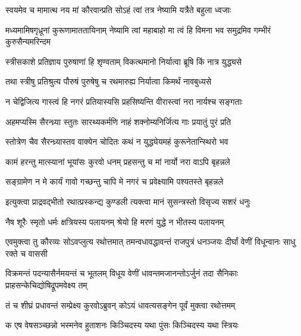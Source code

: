 \twolineshloka
{स्वयमेव च मामात्थ नय मां कौरवान्प्रति}
{सोऽहं त्वां तत्र नेष्यामि यत्रैते बहुला ध्वजाः}


\threelineshloka
{मध्यमामिषगृध्रूनां कुरूणामाततायिनाम्}
{नेष्यामि त्वां महाबाहो मा त्वं हि विमना भव}
{समुद्रमिव गम्भीरं कुरुसैन्यमरिन्दम}


\twolineshloka
{स्त्रीसकाशे प्रतिज्ञाय पुरुषाणां हि शृण्वताम्}
{विकत्थमानो निर्यात्वा ब्रूषि किं नात्र युद्ध्यसे}


\twolineshloka
{तथा स्त्रीषु प्रतिश्रुत्य पौरुषं पुरुषेषु च}
{रथमारुह्य निर्यात्वा किमर्थं नावबुध्यसे}


\twolineshloka
{न चेद्विजित्य गास्त्वं हि नगरं प्रतियास्यसि}
{प्रहसिष्यन्ति वीरास्त्वां नरा नार्यश्च सङ्गताः}


\twolineshloka
{अहमप्यस्मि सैरन्ध्र्या स्तुतः सारथ्यकर्मणि}
{नाहं शक्नोम्यनिर्जित्य गाः प्रयातुं पुरं प्रति}


\twolineshloka
{स्तोत्रेण चैव सैरन्ध्र्यास्तव वाक्येन चोदितः}
{कथं न युद्ध्येयमहं कुरूनेतान्स्थिरो भव}




\twolineshloka
{कामं हरन्तु मात्स्यानां भूयांसः कुरवो धनम्}
{प्रहसन्तु च मां नार्यो नरा वाऽपि बृहन्नले}


\twolineshloka
{सङ्ग्रामेण न मे कार्यं गावो गच्छन्तु चापि मे}
{नगरं च प्रवेक्ष्यामि पश्यतस्ते बृहन्नले}



\twolineshloka
{इत्युक्त्वा प्राद्रवद्भीतो रथात्प्रस्कन्द्य कुण्डली}
{त्यक्त्वा मानं सुसन्त्रस्तो विसृज्य सशरं धनुः}




\twolineshloka
{नैष शूरैः स्मृतो धर्मः क्षत्रियस्य पलायनम्}
{श्रेयो हि मरणं युद्धे न भीतस्य पलायनम्}



\threelineshloka
{एवमुक्त्वा तु कौरव्यः सोऽवप्लुत्य रथोत्तमात्}
{तमन्वधावद्धावन्तं राजपुत्रं धनञ्जयः}
{दीर्घां वेणीं विधून्वानः साधु रक्ते च वाससी}


\threelineshloka
{विक्रमन्तं पदन्यासैर्नमयन्तं च भूतलम्}
{विधूय वेणीं धावन्तमजानन्तोऽर्जुनं तदा}
{सैनिकाः प्राहसन्केचिद्योषिद्रूपमवेक्ष्य तम्}


\twolineshloka
{तं च शीघ्रं प्रधावन्तं सम्प्रेक्ष्य कुरवोऽब्रुवन्}
{कोऽयं धावत्यसङ्गेन पूर्वं मुक्त्वा रथोत्तमम्}


\twolineshloka
{क एष वेषसञ्च्छन्नो भस्मनेव हुताशनः}
{किञ्चिदस्य यथा पुंसः किञ्चिदस्य यथा स्त्रियः}


